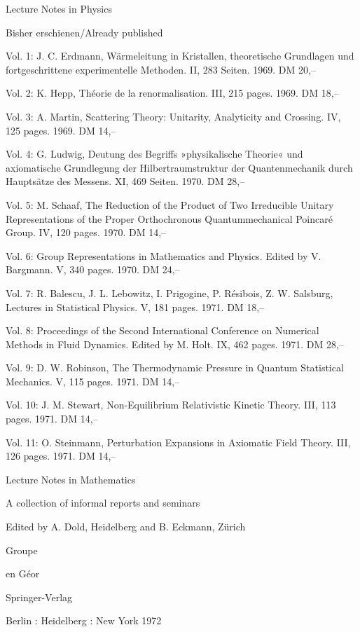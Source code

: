 \medskip
\noindent
Lecture Notes in Physics\par
Bisher erschienen/Already published\par
Vol. 1: J. C. Erdmann, Wärmeleitung in Kristallen, theoretische Grundlagen und fortgeschrittene experimentelle Methoden. II, 283 Seiten. 1969. DM 20,--\par
Vol. 2: K. Hepp, Théorie de la renormalisation. III, 215 pages. 1969. DM 18,--\par
Vol. 3: A. Martin, Scattering Theory: Unitarity, Analyticity and Crossing. IV, 125 pages. 1969. DM 14,--\par
Vol. 4: G. Ludwig, Deutung des Begriffs »physikalische Theorie« und axiomatische Grundlegung der Hilbertraumstruktur der Quantenmechanik durch Hauptsätze des Messens. XI, 469 Seiten. 1970. DM 28,--\par
Vol. 5: M. Schaaf, The Reduction of the Product of Two Irreducible Unitary Representations of the Proper Orthochronous Quantummechanical Poincaré Group. IV, 120 pages. 1970. DM 14,--\par
Vol. 6: Group Representations in Mathematics and Physics. Edited by V. Bargmann. V, 340 pages. 1970. DM 24,--\par
Vol. 7: R. Balescu, J. L. Lebowitz, I. Prigogine, P. Résibois, Z. W. Salsburg, Lectures in Statistical Physics. V, 181 pages. 1971. DM 18,--\par
Vol. 8: Proceedings of the Second International Conference on Numerical Methods in Fluid Dynamics. Edited by M. Holt. IX, 462 pages. 1971. DM 28,--\par
Vol. 9: D. W. Robinson, The Thermodynamic Pressure in Quantum Statistical Mechanics. V, 115 pages. 1971. DM 14,--\par
Vol. 10: J. M. Stewart, Non-Equilibrium Relativistic Kinetic Theory. III, 113 pages. 1971. DM 14,--\par
Vol. 11: O. Steinmann, Perturbation Expansions in Axiomatic Field Theory. III, 126 pages. 1971. DM 14,--\par
\clearpage

\begin{center}
Lecture Notes in Mathematics

A collection of informal reports and seminars

Edited by A. Dold, Heidelberg and B. Eckmann, Zürich


\bigskip
Groupe

en Géor

\bigskip
Springer-Verlag

Berlin : Heidelberg : New York 1972
\end{center}
\clearpage

